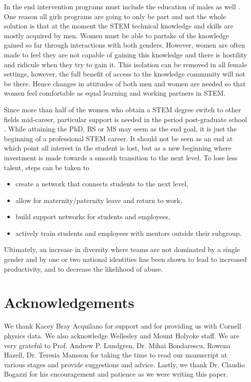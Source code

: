 \documentclass[utf8]{frontiersSCNS} %
\begin{document}
In the end intervention programs must include the education of males as well \citep{stoet2019simplified}. One reason all girls programs are going to only be part and not the whole solution is that at the moment the STEM technical knowledge and skills are mostly acquired by men. Women must be able to partake of the knowledge gained so far through interactions with both genders. However, women are often made to feel they are not capable of gaining this knowledge and there is hostility and ridicule when they try to gain it. This isolation can be removed in all female settings, however, the full benefit of access to the knowledge community will not be there. Hence changes in attitudes of both men and women are needed so that women feel comfortable as equal learning and working partners in STEM.

Since more than half of the women who obtain a STEM degree switch to other fields mid-career, particular support is needed in the period post-graduate school \citep{hewlett2008athena,huyer2015gender,2018Report}.  While attaining the PhD, BS or MS may seem as the end goal, it is just the beginning of a professional STEM career. It should not be seen as an end at which point all interest in the student is lost, but as a new beginning where investment is made towards a smooth transition to the next level. To lose less talent, steps can be taken to
\begin{itemize}
\item create a network that connects students to the next level, \item allow for maternity/paternity leave and return to work, \item build support networks for students and employees,  
\item actively train students and employees with mentors outside their subgroup.
\end{itemize}
Ultimately, an increase in diversity where teams are not dominated by a single gender and by one or two national identities has been shown to lead to increased productivity, and to decrease the likelihood of abuse. 

\section*{Acknowledgements}
We thank Kacey Bray Acquilano for support and for providing us with Cornell physics data. We also acknowledge Wellesley and Mount Holyoke staff. We are very grateful to Prof. Andrew P. Lundgren, Dr. Mihai Bondarescu, Rowena Hazell, Dr. Teresia Mansson for taking the time to read our manuscript at various stages and provide suggestions and advice. Lastly, we thank Dr. Claudio Bogazzi for his encouragement and patience as we were writing this paper.
\end{document}

